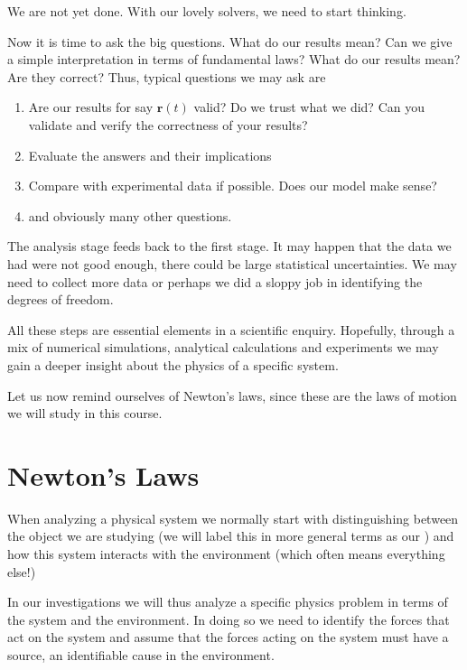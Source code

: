 \documentclass[letterpaper,10pt,english]{sphinxmanual}
\begin{document}
We are not yet done. With our lovely solvers, we need to start thinking.

Now it is time to ask the big questions. What do our results mean? Can we give a simple interpretation in terms of fundamental laws?  What do our results mean? Are they correct?
Thus, typical questions we may ask are
\begin{enumerate}
%
\item {} 
Are our results for say \(\boldsymbol{r}(t)\) valid?  Do we trust what we did?  Can you validate and verify the correctness of your results?

\item {} 
Evaluate the answers and their implications

\item {} 
Compare with experimental data if possible. Does our model make sense?

\item {} 
and obviously many other questions.

\end{enumerate}

The analysis stage feeds back to the first stage. It may happen that
the data we had were not good enough, there could be large statistical
uncertainties. We may need to collect more data or perhaps we did a
sloppy job in identifying the degrees of freedom.

All these steps are essential elements in a scientific
enquiry. Hopefully, through a mix of numerical simulations, analytical
calculations and experiments we may gain a deeper insight about the
physics of a specific system.

Let us now remind ourselves of Newton’s laws, since these are the laws of motion we will study in this course.


\section{Newton’s Laws}
\label{\detokenize{chapter1:newton-s-laws}}
When analyzing a physical system we normally start with distinguishing between the object we are studying (we will label this in more general terms as our ) and how this system interacts with the environment (which often means everything else!)

In our investigations we will thus analyze a specific physics problem in terms of the system and the environment.
In doing so we need to identify the forces that act on the system and assume that the
forces acting on the system must have a source, an identifiable cause in
the environment.
\end{document}
